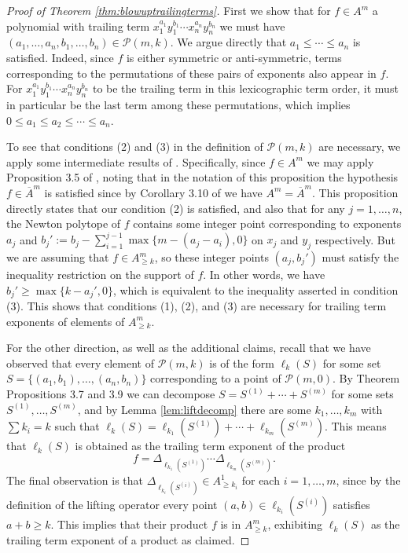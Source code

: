 \documentclass[12pt]{amsart}
\numberwithin{equation}{section}
\theoremstyle{definition}
\begin{document}
\begin{proof}[Proof of Theorem \ref{thm:blowuptrailingterms}]
    First we show that for $f\in A^m$ a polynomial with trailing term $x_1^{a_1}y_1^{b_1}\cdots x_n^{a_n}y_n^{b_n}$ we must have $(a_1,\dots,a_n,b_1,\dots,b_n)\in \mathcal{P}(m,k)$. We argue directly that $a_1\leq \cdots\leq a_n$ is satisfied. Indeed, since $f$ is either symmetric or anti-symmetric, terms corresponding to the permutations of these pairs of exponents also appear in $f$. For $x_1^{a_1}y_1^{b_1}\cdots x_n^{a_n}y_n^{b_n}$ to be the trailing term in this lexicographic term order, it must in particular be the last term among these permutations, which implies $0\leq a_1\leq a_2 \leq \cdots \leq a_n$. 
    
    To see that conditions (2) and (3) in the definition of $\mathcal{P}(m,k)$ are necessary, we apply some intermediate results of \cite{C}. Specifically, since $f\in A^m$ we may apply Proposition 3.5 of \cite{C}, noting that in the notation of this proposition the hypothesis $f\in \overline{A}^m$ is satisfied since by Corollary 3.10 of \cite{C} we have $A^m = \overline{A}^m$. This proposition directly states that our condition (2) is satisfied, and also that for any $j=1,\dots,n$, the Newton polytope of $f$ contains some integer point corresponding to exponents $a_j$ and $b_j' := b_j-\sum_{i=1}^{j-1} \max\{ m-(a_j-a_i),0\}$ on $x_j$ and $y_j$ respectively. But we are assuming that $f\in A^m_{\geq k}$, so these integer points $(a_j,b_j')$ must satisfy the inequality restriction on the support of $f$. In other words, we have $b_j' \geq \max\{k-a_j',0\}$, which is equivalent to the inequality asserted in condition (3). This shows that conditions (1), (2), and (3) are necessary for trailing term exponents of elements of $A^m_{\geq k}$.

    For the other direction, as well as the additional claims, recall that we have observed that every element of $\mathcal{P}(m,k)$ is of the form $\ell_k(S)$ for some set $S= \{ (a_1,b_1),\dots,(a_n,b_n) \}$ corresponding to a point of $\mathcal{P}(m,0)$. By Theorem \cite{C} Propositions 3.7 and 3.9 we can decompose $S= S^{(1)}+\cdots+S^{(m)}$ for some sets $S^{(1)},\dots,S^{(m)}$, and by Lemma \ref{lem:liftdecomp} there are some $k_1,\dots,k_m$ with $\sum k_i = k$ such that $\ell_k(S) = \ell_{k_1}(S^{(1)})+\cdots+\ell_{k_m}(S^{(m)})$. This means that $\ell_k(S)$ is obtained as the trailing term exponent of the product
    \[ f = \Delta_{\ell_{k_1}(S^{(1)})}\cdots \Delta_{\ell_{k_m}(S^{(m)})}. \]
    The final observation is that $\Delta_{\ell_{k_i}(S^{(i)})}\in A^1_{\geq k_i}$ for each $i=1,\dots,m$, since by the definition of the lifting operator every point $(a,b)\in \ell_{k_i}(S^{(i)})$ satisfies $a+b\geq k$. This implies that their product $f$ is in $A^m_{\geq k}$, exhibiting $\ell_k(S)$ as the trailing term exponent of a product as claimed.
\end{proof}
\end{document}
